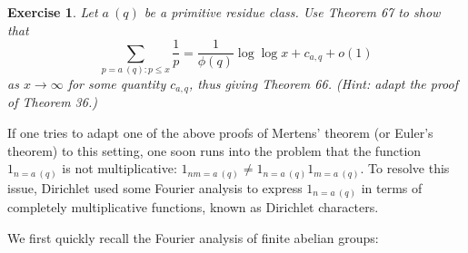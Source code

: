 \documentclass[10pt,reqno]{amsart}
\newtheorem{exercise}[theorem]{Exercise}
\begin{document}
\begin{exercise}
    Let $a\ (q)$ be a primitive residue class. Use Theorem 67 to show that
    \[  \sum_{p = a\ (q): p \leq x} \frac{1}{p} = \frac{1}{\phi(q)} \log\log x + c_{a,q} + o(1)\]
    as $x \rightarrow \infty$ for some quantity $c_{a,q}$, thus giving Theorem 66. (Hint: adapt the proof of Theorem 36.)
\end{exercise}

If one tries to adapt one of the above proofs of Mertens’ theorem (or Euler’s theorem) to this setting, one soon runs into the problem that the function $1_{n=a\ (q)}$ is not multiplicative: $1_{nm = a\ (q)} \neq 1_{n = a\ (q)} 1_{m = a\ (q)}$. To resolve this issue, Dirichlet used some Fourier analysis to express $1_{n=a\ (q)}$ in terms of completely multiplicative functions, known as Dirichlet characters.

We first quickly recall the Fourier analysis of finite abelian groups:
\end{document}

